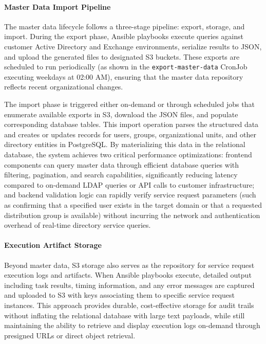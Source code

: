 \paragraph{Master Data Import Pipeline}

The master data lifecycle follows a three-stage pipeline: export, storage, and import. During the export phase, Ansible playbooks execute queries against customer Active Directory and Exchange environments, serialize results to JSON, and upload the generated files to designated S3 buckets. These exports are scheduled to run periodically (as shown in the \texttt{export-master-data} CronJob executing weekdays at 02:00 AM), ensuring that the master data repository reflects recent organizational changes.

The import phase is triggered either on-demand or through scheduled jobs that enumerate available exports in S3, download the JSON files, and populate corresponding database tables. This import operation parses the structured data and creates or updates records for users, groups, organizational units, and other directory entities in PostgreSQL. By materializing this data in the relational database, the system achieves two critical performance optimizations: frontend components can query master data through efficient database queries with filtering, pagination, and search capabilities, significantly reducing latency compared to on-demand LDAP queries or API calls to customer infrastructure; and backend validation logic can rapidly verify service request parameters (such as confirming that a specified user exists in the target domain or that a requested distribution group is available) without incurring the network and authentication overhead of real-time directory service queries.

\paragraph{Execution Artifact Storage}

Beyond master data, S3 storage also serves as the repository for service request execution logs and artifacts. When Ansible playbooks execute, detailed output including task results, timing information, and any error messages are captured and uploaded to S3 with keys associating them to specific service request instances. This approach provides durable, cost-effective storage for audit trails without inflating the relational database with large text payloads, while still maintaining the ability to retrieve and display execution logs on-demand through presigned URLs or direct object retrieval.

